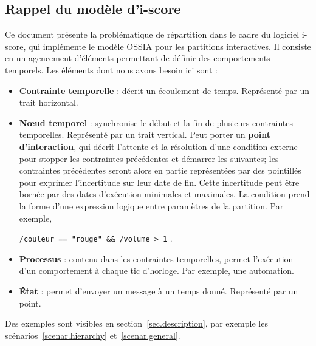 \documentclass{article}
\newcommand\ossia{OSSIA\xspace}
\newcommand\vocab[1]{\textbf{#1}}
\begin{document}






\subsection{Rappel du modèle d'i-score}
Ce document présente la problématique de répartition dans le cadre du logiciel i-score, qui implémente le modèle \ossia\cite{celerier2015ossia} pour les partitions interactives.
Il consiste en un agencement d'éléments permettant de définir des comportements temporels. 
Les éléments dont nous avons besoin ici sont : 
\begin{itemize}
	\item \vocab{Contrainte temporelle} : décrit un écoulement de temps. 
    Représenté par un trait horizontal. 
	\item \vocab{Nœud temporel} : synchronise le début et la fin de plusieurs contraintes temporelles. Représenté par un trait vertical.
	Peut porter un \vocab{point d'interaction}, qui décrit l'attente et la résolution d'une condition externe pour stopper les contraintes précédentes et démarrer les suivantes; les contraintes précédentes seront alors en partie représentées par des pointillés pour exprimer l'incertitude sur leur date de fin. 
    Cette incertitude peut être bornée par des dates d'exécution minimales et maximales.
    La condition prend la forme d'une expression logique entre paramètres de la partition. Par exemple, 
    
    \lstinline|/couleur == "rouge" && /volume > 1| .
	\item \vocab{Processus} : contenu dans les contraintes temporelles, permet l'exécution d'un comportement à chaque tic d'horloge. Par exemple, une automation.
	\item \vocab{État} : permet d'envoyer un message à un temps donné. Représenté par un point.
\end{itemize}
Des exemples sont visibles en section~\ref{sec.description}, par exemple les scénarios~\ref{scenar.hierarchy} et~\ref{scenar.general}.
\end{document}
